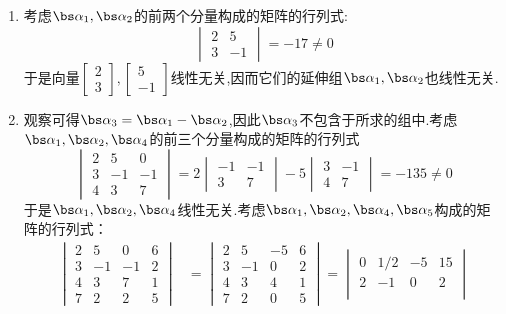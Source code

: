 \documentclass{ctexart}
\begin{document}
\begin{solution}
\begin{enumerate}
    \item 考虑$\bs\alpha_1,\bs\alpha_2$的前两个分量构成的矩阵的行列式:
    \[\begin{vmatrix}
        2&5\\3&-1
    \end{vmatrix}=-17\neq0\]
    于是向量$\begin{bmatrix}
        2\\3
    \end{bmatrix},\begin{bmatrix}
        5\\-1
    \end{bmatrix}$线性无关,因而它们的延伸组$\bs\alpha_1,\bs\alpha_2$也线性无关.
    \item 观察可得$\bs\alpha_3=\bs\alpha_1-\bs\alpha_2$,因此$\bs\alpha_3$不包含于所求的组中.考虑$\bs\alpha_1,\bs\alpha_2,\bs\alpha_4$的前三个分量构成的矩阵的行列式
    \[\begin{vmatrix}
        2&5&0\\
        3&-1&-1\\
        4&3&7
    \end{vmatrix}=2\begin{vmatrix}
        -1&-1\\3&7
    \end{vmatrix}-5\begin{vmatrix}
        3&-1\\4&7
    \end{vmatrix}=-135\neq0\]
    于是$\bs\alpha_1,\bs\alpha_2,\bs\alpha_4$线性无关.考虑$\bs\alpha_1,\bs\alpha_2,\bs\alpha_4,\bs\alpha_5$构成的矩阵的行列式：
    \[\begin{aligned}
        \begin{vmatrix}
        2&5&0&6\\
        3&-1&-1&2\\
        4&3&7&1\\
        7&2&2&5
    \end{vmatrix}
    &=\begin{vmatrix}
        2&5&-5&6\\
        3&-1&0&2\\
        4&3&4&1\\
        7&2&0&5
    \end{vmatrix}=\begin{vmatrix}
        0&1/2&-5&15\\
        2&-1&0&2\\

\end{vmatrix}
\end{aligned}\]
\end{enumerate}
\end{solution}
\end{document}

